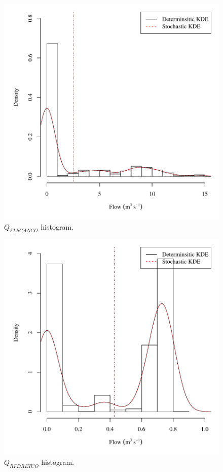 \begin{center}
\begin{figure}[htbp]
	\includegraphics[width=6in]{"Figures/Results_USR/V density qFLS"}
	\caption{$Q_{FLSCANCO}$ histogram.}
\end{figure}
\end{center}
\newpage

\begin{center}
\begin{figure}[htbp]
	\includegraphics[width=6in]{"Figures/Results_USR/V density qRFR"}
	\caption{$Q_{RFDRETCO}$ histogram.}
\end{figure}
\end{center}
\newpage

